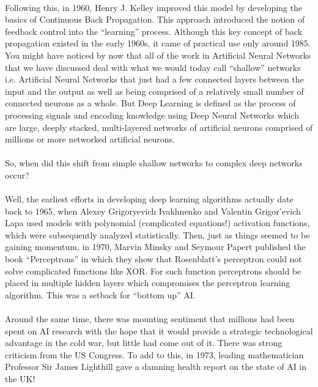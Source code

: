 \documentclass[12pt,a4paper]{article}
\begin{document}
\paragraph{}
Following this, in 1960, Henry J. Kelley improved this model by developing the basics of Continuous Back Propagation. This approach introduced the notion of feedback control into the “learning” process. Although this key concept of back propagation existed in the early 1960s, it came of practical use only around 1985. 
You might have noticed by now that all of the work in Artificial Neural Networks  that we have discussed deal with what we would today call “shallow” networks i.e. Artificial Neural Networks that just had a few connected layers between the input and the output as well as being comprised of a relatively small number of connected neurons as a whole. But Deep Learning is defined as the process of processing signals and encoding knowledge using Deep Neural Networks which are large, deeply stacked, multi-layered networks of artificial neurons comprised of millions or more networked artificial neurons.  
\paragraph{}
So, when did this shift from simple shallow networks to complex deep networks occur? 
\paragraph{}
Well, the earliest efforts in developing deep learning algorithms actually date back to 1965, when Alexey Grigoryevich Ivakhnenko and Valentin Grigor'evich Lapa used models with polynomial (complicated equations!) activation functions, which were subsequently analyzed statistically. Then, just as things seemed to be gaining momentum, in 1970, Marvin Minsky and Seymour Papert published the book “Perceptrons” in which they show that Rosenblatt’s perceptron could not solve complicated functions like XOR. For such function perceptrons should be placed in multiple hidden layers which compromises the perceptron learning algorithm. This was a setback for “bottom up” AI. 
\paragraph{}
Around the same time, there was mounting sentiment that millions had been spent on AI research with the hope that it would provide a strategic technological advantage in the cold war, but little had come out of it. There was strong criticism from the US Congress. To add to this, in 1973, leading mathematician Professor Sir James Lighthill gave a damning health report on the state of AI in the UK!
\end{document}
